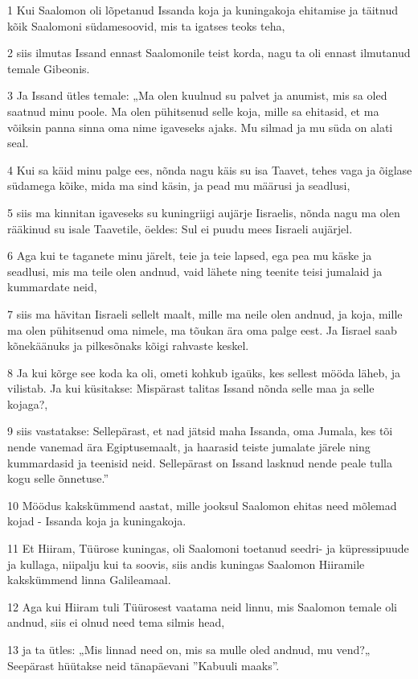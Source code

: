 \par 1 Kui Saalomon oli lõpetanud Issanda koja ja kuningakoja ehitamise ja täitnud kõik Saalomoni südamesoovid, mis ta igatses teoks teha,
\par 2 siis ilmutas Issand ennast Saalomonile teist korda, nagu ta oli ennast ilmutanud temale Gibeonis.
\par 3 Ja Issand ütles temale: „Ma olen kuulnud su palvet ja anumist, mis sa oled saatnud minu poole. Ma olen pühitsenud selle koja, mille sa ehitasid, et ma võiksin panna sinna oma nime igaveseks ajaks. Mu silmad ja mu süda on alati seal.
\par 4 Kui sa käid minu palge ees, nõnda nagu käis su isa Taavet, tehes vaga ja õiglase südamega kõike, mida ma sind käsin, ja pead mu määrusi ja seadlusi,
\par 5 siis ma kinnitan igaveseks su kuningriigi aujärje Iisraelis, nõnda nagu ma olen rääkinud su isale Taavetile, öeldes: Sul ei puudu mees Iisraeli aujärjel.
\par 6 Aga kui te taganete minu järelt, teie ja teie lapsed, ega pea mu käske ja seadlusi, mis ma teile olen andnud, vaid lähete ning teenite teisi jumalaid ja kummardate neid,
\par 7 siis ma hävitan Iisraeli sellelt maalt, mille ma neile olen andnud, ja koja, mille ma olen pühitsenud oma nimele, ma tõukan ära oma palge eest. Ja Iisrael saab kõnekäänuks ja pilkesõnaks kõigi rahvaste keskel.
\par 8 Ja kui kõrge see koda ka oli, ometi kohkub igaüks, kes sellest mööda läheb, ja vilistab. Ja kui küsitakse: Mispärast talitas Issand nõnda selle maa ja selle kojaga?,
\par 9 siis vastatakse: Sellepärast, et nad jätsid maha Issanda, oma Jumala, kes tõi nende vanemad ära Egiptusemaalt, ja haarasid teiste jumalate järele ning kummardasid ja teenisid neid. Sellepärast on Issand lasknud nende peale tulla kogu selle õnnetuse.”
\par 10 Möödus kakskümmend aastat, mille jooksul Saalomon ehitas need mõlemad kojad - Issanda koja ja kuningakoja.
\par 11 Et Hiiram, Tüürose kuningas, oli Saalomoni toetanud seedri- ja küpressipuude ja kullaga, niipalju kui ta soovis, siis andis kuningas Saalomon Hiiramile kakskümmend linna Galileamaal.
\par 12 Aga kui Hiiram tuli Tüürosest vaatama neid linnu, mis Saalomon temale oli andnud, siis ei olnud need tema silmis head,
\par 13 ja ta ütles: „Mis linnad need on, mis sa mulle oled andnud, mu vend?„ Seepärast hüütakse neid tänapäevani ”Kabuuli maaks”.
